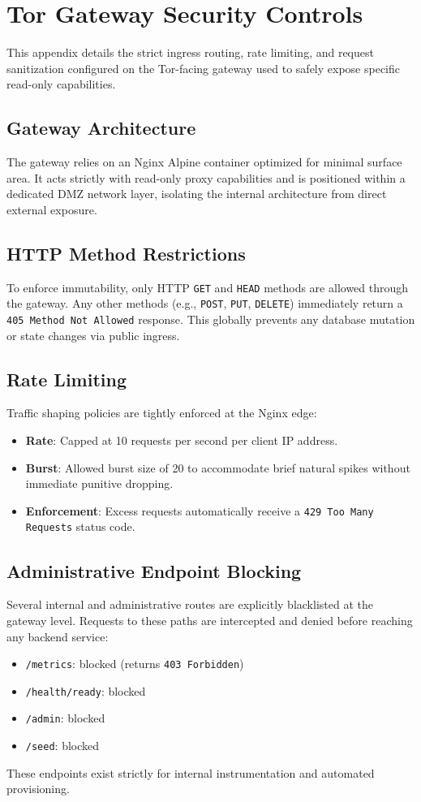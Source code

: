 \chapter{Tor Gateway Security Controls}
\label{app:tor-gateway}

This appendix details the strict ingress routing, rate limiting, and request sanitization configured on the Tor-facing gateway used to safely expose specific read-only capabilities.

\section{Gateway Architecture}
The gateway relies on an Nginx Alpine container optimized for minimal surface area. It acts strictly with read-only proxy capabilities and is positioned within a dedicated DMZ network layer, isolating the internal architecture from direct external exposure.

\section{HTTP Method Restrictions}
To enforce immutability, only HTTP \texttt{GET} and \texttt{HEAD} methods are allowed through the gateway. Any other methods (e.g., \texttt{POST}, \texttt{PUT}, \texttt{DELETE}) immediately return a \texttt{405 Method Not Allowed} response. This globally prevents any database mutation or state changes via public ingress.

\section{Rate Limiting}
Traffic shaping policies are tightly enforced at the Nginx edge:
\begin{itemize}
    \item \textbf{Rate}: Capped at 10 requests per second per client IP address.
    \item \textbf{Burst}: Allowed burst size of 20 to accommodate brief natural spikes without immediate punitive dropping.
    \item \textbf{Enforcement}: Excess requests automatically receive a \texttt{429 Too Many Requests} status code.
\end{itemize}

\section{Administrative Endpoint Blocking}
Several internal and administrative routes are explicitly blacklisted at the gateway level. Requests to these paths are intercepted and denied before reaching any backend service:
\begin{itemize}
    \item \texttt{/metrics}: blocked (returns \texttt{403 Forbidden})
    \item \texttt{/health/ready}: blocked
    \item \texttt{/admin}: blocked
    \item \texttt{/seed}: blocked
\end{itemize}
These endpoints exist strictly for internal instrumentation and automated provisioning.

